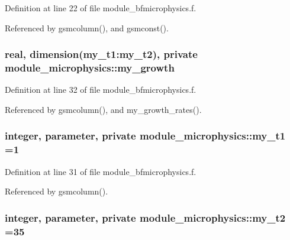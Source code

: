 Definition at line 22 of file module\+\_\+bfmicrophysics.\+f.



Referenced by gsmcolumn(), and gsmconst().

\subsubsection[{\texorpdfstring{my\+\_\+growth}{my_growth}}]{\setlength{\rightskip}{0pt plus 5cm}real, dimension(my\+\_\+t1\+:my\+\_\+t2), private module\+\_\+microphysics\+::my\+\_\+growth\hspace{0.3cm}{\ttfamily [private]}}\hypertarget{namespacemodule__microphysics_a05041f6bd94be58f8b3bddac6b374b41}{}\label{namespacemodule__microphysics_a05041f6bd94be58f8b3bddac6b374b41}


Definition at line 32 of file module\+\_\+bfmicrophysics.\+f.



Referenced by gsmcolumn(), and my\+\_\+growth\+\_\+rates().

\subsubsection[{\texorpdfstring{my\+\_\+t1}{my_t1}}]{\setlength{\rightskip}{0pt plus 5cm}integer, parameter, private module\+\_\+microphysics\+::my\+\_\+t1 =1\hspace{0.3cm}{\ttfamily [private]}}\hypertarget{namespacemodule__microphysics_aae73524f22f4bc2373aaa5d8a6f7e7d6}{}\label{namespacemodule__microphysics_aae73524f22f4bc2373aaa5d8a6f7e7d6}


Definition at line 31 of file module\+\_\+bfmicrophysics.\+f.



Referenced by gsmcolumn().

\subsubsection[{\texorpdfstring{my\+\_\+t2}{my_t2}}]{\setlength{\rightskip}{0pt plus 5cm}integer, parameter, private module\+\_\+microphysics\+::my\+\_\+t2 =35\hspace{0.3cm}{\ttfamily [private]}}\hypertarget{namespacemodule__microphysics_a01af6bac32c88fd12ba020f66ad0ae80}{}\label{namespacemodule__microphysics_a01af6bac32c88fd12ba020f66ad0ae80}


